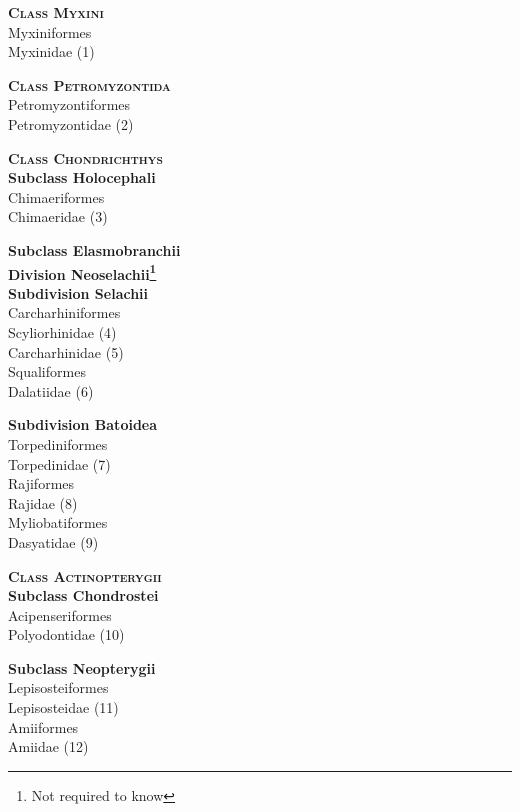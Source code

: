 \documentclass[12pt, hidelinks]{exam}
\newcommand{\onedent}{\hspace*{1em}}
\newcommand{\twodent}{\hspace*{2em}}
\begin{document}
\noindent\begin{multicols}{2}


\textbf{\textsc{ Class Myxini}} \\
\onedent Myxiniformes\\
\twodent Myxinidae (1)

\textbf{\textsc{Class Petromyzontida}}\\
\onedent Petromyzontiformes \\
\twodent Petromyzontidae (2)

\textbf{\textsc{Class Chondrichthys}}\\
\textbf{Subclass Holocephali} \\
\onedent Chimaeriformes \\
\twodent Chimaeridae (3)

\textbf{Subclass Elasmobranchii}\\
\hspace*{0.33em}\textbf{Division Neoselachii\footnote{Not required to know}}\\
\hspace*{0.67em}\textbf{Subdivision Selachii }\\
\onedent Carcharhiniformes \\
\twodent Scyliorhinidae (4) \\
\twodent Carcharhinidae (5) \\
\onedent Squaliformes \\
\twodent Dalatiidae (6)

\hspace*{0.67em}\textbf{Subdivision Batoidea}\\
\onedent Torpediniformes \\
\twodent Torpedinidae (7) \\
\onedent Rajiformes \\
\twodent Rajidae (8) \\
\onedent Myliobatiformes \\
\twodent Dasyatidae (9)

\textbf{\textsc{Class Actinopterygii}}\\
\textbf{Subclass Chondrostei} \\
\onedent Acipenseriformes\\ 
\twodent Polyodontidae (10)

\textbf{Subclass Neopterygii}\\
\onedent Lepisosteiformes \\
\twodent Lepisosteidae (11) \\
\onedent Amiiformes\\
\twodent Amiidae (12)\\
\columnbreak


\end{multicols}
\end{document}
